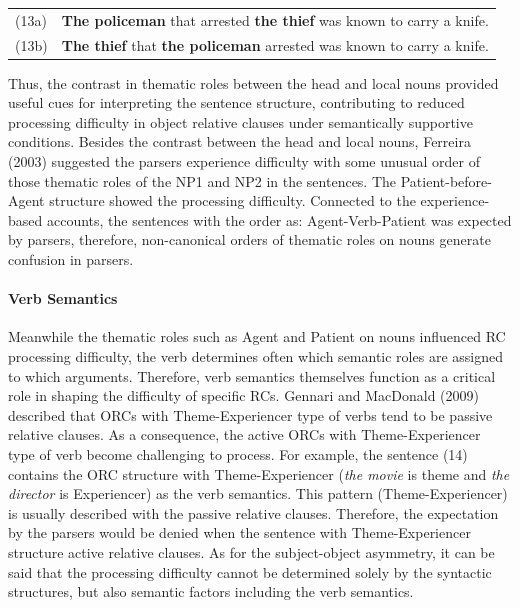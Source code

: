 \documentclass[
]{article}
\begin{document}
\vspace{1em}
\setlength{\parindent}{0pt}
\noindent
\begin{tabular}[t]{@{}ll}
(13a) & \textbf{The policeman} that arrested \textbf{the thief} was known to carry a knife. \\
(13b) & \textbf{The thief} that \textbf{the policeman} arrested was known to carry a knife. \\
\end{tabular}
\vspace{1em}

\setlength{\parindent}{1.27cm}

Thus, the contrast in thematic roles between the head and local nouns
provided useful cues for interpreting the sentence structure,
contributing to reduced processing difficulty in object relative clauses
under semantically supportive conditions. Besides the contrast between
the head and local nouns, Ferreira (2003) suggested the parsers
experience difficulty with some unusual order of those thematic roles of
the NP1 and NP2 in the sentences. The Patient-before-Agent structure
showed the processing difficulty. Connected to the experience-based
accounts, the sentences with the order as: Agent-Verb-Patient was
expected by parsers, therefore, non-canonical orders of thematic roles
on nouns generate confusion in parsers.

\paragraph{Verb Semantics}\label{verb-semantics}

Meanwhile the thematic roles such as Agent and Patient on nouns
influenced RC processing difficulty, the verb determines often which
semantic roles are assigned to which arguments. Therefore, verb
semantics themselves function as a critical role in shaping the
difficulty of specific RCs. Gennari and MacDonald (2009) described that
ORCs with Theme-Experiencer type of verbs tend to be passive relative
clauses. As a consequence, the active ORCs with Theme-Experiencer type
of verb become challenging to process. For example, the sentence (14)
contains the ORC structure with Theme-Experiencer (\emph{the movie} is
theme and \emph{the director} is Experiencer) as the verb semantics.
This pattern (Theme-Experiencer) is usually described with the passive
relative clauses. Therefore, the expectation by the parsers would be
denied when the sentence with Theme-Experiencer structure active
relative clauses. As for the subject-object asymmetry, it can be said
that the processing difficulty cannot be determined solely by the
syntactic structures, but also semantic factors including the verb
semantics.
\end{document}
